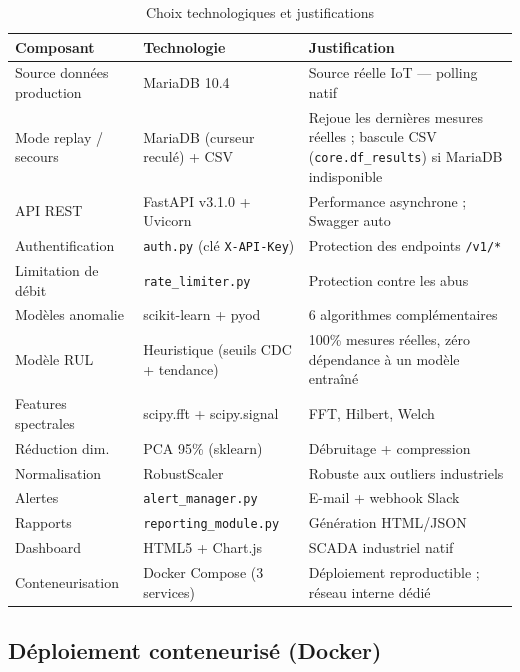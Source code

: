 \documentclass[12pt,a4paper]{report}
\begin{document}
\begin{table}[H]
\centering
\caption{Choix technologiques et justifications}
\begin{tabular}{lll}
\toprule
\textbf{Composant} & \textbf{Technologie} & \textbf{Justification} \\
\midrule
Source données production & MariaDB 10.4           & Source réelle IoT — polling natif \\
Mode replay / secours     & MariaDB (curseur reculé) + CSV & Rejoue les dernières mesures réelles ; bascule CSV
  (\texttt{core.df\_results}) si MariaDB indisponible \\
API REST                  & FastAPI v3.1.0 + Uvicorn & Performance asynchrone ; Swagger auto \\
Authentification          & \texttt{auth.py} (clé \texttt{X-API-Key}) & Protection des endpoints \texttt{/v1/*} \\
Limitation de débit       & \texttt{rate\_limiter.py} & Protection contre les abus \\
Modèles anomalie          & scikit-learn + pyod    & 6 algorithmes complémentaires \\
Modèle RUL                & Heuristique (seuils CDC + tendance) & 100\% mesures réelles, zéro dépendance à un modèle entraîné \\
Features spectrales       & scipy.fft + scipy.signal & FFT, Hilbert, Welch \\
Réduction dim.            & PCA 95\% (sklearn)     & Débruitage + compression \\
Normalisation             & RobustScaler           & Robuste aux outliers industriels \\
Alertes                   & \texttt{alert\_manager.py} & E-mail + webhook Slack \\
Rapports                  & \texttt{reporting\_module.py} & Génération HTML/JSON \\
Dashboard                 & HTML5 + Chart.js       & SCADA industriel natif \\
Conteneurisation          & Docker Compose (3 services) & Déploiement reproductible ; réseau
  interne dédié \\
\bottomrule
\end{tabular}
\end{table}

\subsection{Déploiement conteneurisé (Docker)}
\end{document}
